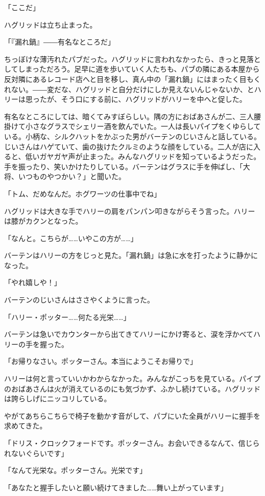 \documentclass[10pt,a4paper]{article}
\begin{document}
\begin{CJK}{UTF8}{min}
「ここだ」

ハグリッドは立ち止まった。

「『漏れ鍋』――有名なところだ」

ちっぼけな薄汚れたパブだった。ハグリッドに言われなかったら、きっと見落としてしまっただろう。足早に道を歩いていく人たちも、パブの隣にある本屋から反対隣にあるレコード店へと目を移し、真ん中の「漏れ鍋」にはまったく目もくれない。――変だな、ハグリッドと自分だけにしか見えないんじゃないか、とハリーは思ったが、そう口にする前に、ハグリッドがハリーを中へと促した。

有名なところにしては、暗くてみすぼらしい。隅の方におばあさんが二、三人腰掛けて小さなグラスでシェリー酒を飲んでいた。一人は長いパイプをくゆらしている。小柄な、シルクハットをかぶった男がバーテンのじいさんと話している。じいさんはハゲていて、歯の抜けたクルミのような顔をしている。二人が店に入ると、低いガヤガヤ声が止まった。みんなハグリッドを知っているようだった。手を振ったり、笑いかけたりしている。バーテンはグラスに手を伸ばし、「大将、いつものやつかい？」と聞いた。

「トム、だめなんだ。ホグワーツの仕事中でね」

ハグリッドは大きな手でハリーの肩をパンパン叩きながらそう言った。ハリーは膝がカクンとなった。

「なんと。こちらが……いやこの方が……」

バーテンはハリーの方をじっと見た。「漏れ鍋」は急に水を打ったように静かになった。

「やれ嬉しや！」

バーテンのじいさんはささやくように言った。

「ハリー・ポッター……何たる光栄……」

バーテンは急いでカウンターから出てきてハリーにかけ寄ると、涙を浮かべてハリーの手を握った。

「お帰りなさい。ポッターさん。本当にようこそお帰りで」

ハリーは何と言っていいかわからなかった。みんながこっちを見ている。パイプのおばあさんは火が消えているのにも気づかず、ふかし続けている。ハグリッドは誇らしげにニッコリしている。

やがてあちらこちらで椅子を動かす音がして、パブにいた全員がハリーに握手を求めてきた。

「ドリス・クロックフォードです。ポッターさん。お会いできるなんて、信じられないぐらいです」

「なんて光栄な。ポッターさん。光栄です」

「あなたと握手したいと願い続けてきました……舞い上がっています」


\end{CJK}
\end{document}
